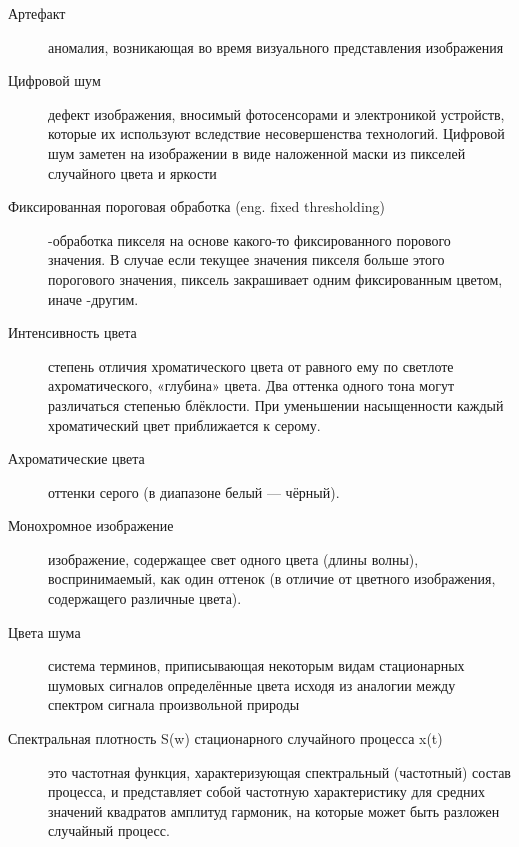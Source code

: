 \Defines %
\begin{description}
\item[Артефакт] 
 аномалия, возникающая во время визуального представления изображения\cite{Wiki}
\item[Цифровой шум] дефект изображения, вносимый фотосенсорами и электроникой устройств, которые их используют вследствие несовершенства технологий.
Цифровой шум заметен на изображении в виде наложенной маски из пикселей случайного цвета и яркости\cite{Wiki}

\item[Фиксированная пороговая обработка (eng. fixed thresholding)] -обработка пикселя на основе какого-то фиксированного порового значения. В случае если текущее значения пикселя больше этого порогового значения, пиксель закрашивает одним фиксированным цветом, иначе -другим. 
\cite{Dh}
\item[Интенсивность цвета]  степень отличия хроматического цвета от равного ему по светлоте ахроматического, «глубина» цвета. Два оттенка одного тона могут различаться степенью блёклости. При уменьшении насыщенности каждый хроматический цвет приближается к серому.\cite{Wiki}
\item[Ахроматические цвета] оттенки серого (в диапазоне белый — чёрный).\cite{Wiki}
\item[Монохромное изображение] изображение, содержащее свет одного цвета (длины волны), воспринимаемый, как один оттенок (в отличие от цветного изображения, содержащего различные цвета).\cite{Wiki}
\item[Цвета шума]система терминов, приписывающая некоторым видам стационарных шумовых сигналов определённые цвета исходя из аналогии между спектром сигнала произвольной природы 
\item[Спектральная плотность S(w) стационарного случайного процесса x(t) ] это частотная функция, характеризующая спектральный (частотный) состав процесса, и представляет собой частотную характеристику для средних значений квадратов амплитуд гармоник, на которые может быть разложен случайный процесс. 



\end{description}

